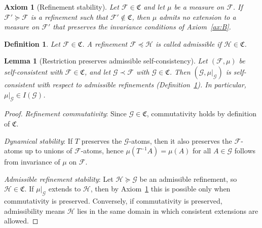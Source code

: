 \documentclass[10pt,a4paper]{amsart}
\newtheorem{axiom}{Axiom}
\newtheorem{definition}{Definition}
\newtheorem{lemma}{Lemma}
\begin{document}
\begin{axiom}[Refinement stability]\label{ax:C}
Let $\mathcal F\in\mathfrak C$ and let $\mu$ be a measure on $\mathcal F$.
If $\mathcal F'\succeq\mathcal F$ is a refinement such that
$\mathcal F'\notin\mathfrak C$, then $\mu$ admits no extension to a
measure on $\mathcal F'$ that preserves the invariance conditions of
Axiom~\ref{ax:B}.
\end{axiom}

\begin{definition}\label{def:admissible}
Let $\mathcal F\in\mathfrak C$. A refinement $\mathcal F\preceq\mathcal H$
is called \emph{admissible} if $\mathcal H\in\mathfrak C$.
\end{definition}

\begin{lemma}[Restriction preserves admissible self-consistency]
\label{lem:restrict}
Let $(\mathcal F,\mu)$ be self-consistent with $\mathcal F\in\mathfrak C$,
and let $\mathcal G\prec\mathcal F$ with $\mathcal G\in\mathfrak C$.
Then $(\mathcal G,\mu|_{\mathcal G})$ is self-consistent with respect to
admissible refinements (Definition~\ref{def:admissible}).
In particular, $\mu|_{\mathcal G}\in I(\mathcal G)$.
\end{lemma}

\begin{proof}
\emph{Refinement commutativity}: Since $\mathcal G\in\mathfrak C$, commutativity holds
by definition of $\mathfrak C$.

\noindent \emph{Dynamical stability}: If $T$ preserves the $\mathcal G$-atoms, then it also
preserves the $\mathcal F$-atoms up to unions of $\mathcal F$-atoms, hence
$\mu(T^{-1}A)=\mu(A)$ for all $A\in\mathcal G$ follows from invariance of
$\mu$ on $\mathcal F$.

\noindent \emph{Admissible refinement stability}: Let $\mathcal H\succeq\mathcal G$ be an
admissible refinement, so $\mathcal H\in\mathfrak C$.
If $\mu|_{\mathcal G}$ extends to $\mathcal H$, then by Axiom~\ref{ax:C}
this is possible only when commutativity is preserved.
Conversely, if commutativity is preserved, admissibility means $\mathcal H$
lies in the same domain in which consistent extensions are allowed.
\end{proof}
\end{document}
